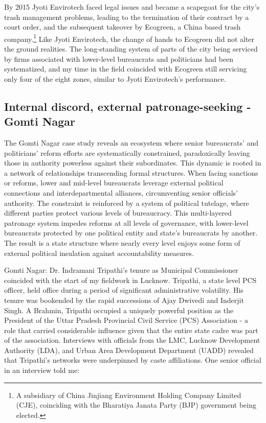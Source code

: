 By 2015 Jyoti Envirotech faced legal issues and became a scapegoat for the city's trash management problems, leading to the termination of their contract by a court order, and the subsequent takeover by Ecogreen, a China based trash company.\footnote{A subsidiary of China Jinjiang Environment Holding Company Limited (CJE), coinciding with the Bharatiya Janata Party (BJP) government being elected.} Like Jyoti Envirotech, the change of hands to Ecogreen did not alter the ground realities. The long-standing system of parts of the city being serviced by firms associated with lower-level bureaucrats and politicians had been systematized, and my time in the field coincided with Ecogreen still servicing only four of the eight zones, similar to Jyoti Envirotech's performance.

\subsection{Internal discord, external patronage-seeking - Gomti Nagar}

The Gomti Nagar case study reveals an ecosystem where senior bureaucrats' and politicians' reform efforts are systematically constrained, paradoxically leaving those in authority powerless against their subordinates. This dynamic is rooted in a network of relationships transcending formal structures. When facing sanctions or reforms, lower and mid-level bureaucrats leverage external political connections and interdepartmental alliances, circumventing senior officials' authority. The constraint is reinforced by a system of political tutelage, where different parties protect various levels of bureaucracy. This multi-layered patronage system impedes reforms at all levels of governance, with lower-level bureaucrats protected by one political entity and state's bureaucrats by another. The result is a state structure where nearly every level enjoys some form of external political insulation against accountability measures.

Gomti Nagar: Dr. Indramani Tripathi's tenure as Municipal Commissioner coincided with the start of my fieldwork in Lucknow. Tripathi, a state level PCS officer, held office during a period of significant administrative volatility. His tenure was bookended by the rapid successions of Ajay Dwivedi and Inderjit Singh. A Brahmin, Tripathi occupied a uniquely powerful position as the President of the Uttar Pradesh Provincial Civil Service (PCS) Association - a role that carried considerable influence given that the entire state cadre was part of the association. Interviews with officials from the LMC, Lucknow Development Authority (LDA), and Urban Area Development Department (UADD) revealed that Tripathi's networks were underpinned by caste affiliations. One senior official in an interview told me:

